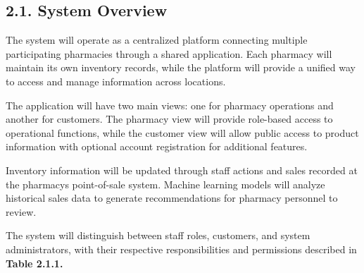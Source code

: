 \subsection{2.1. System Overview}\label{system-overview}

The system will operate as a centralized platform connecting multiple participating pharmacies through a shared application. Each pharmacy will maintain its own inventory records, while the platform will provide a unified way to access and manage information across locations.

The application will have two main views: one for pharmacy operations and another for customers. The pharmacy view will provide role-based access to operational functions, while the customer view will allow public access to product information with optional account registration for additional features.

Inventory information will be updated through staff actions and sales recorded at the pharmacy\textquotesingle s point-of-sale system. Machine learning models will analyze historical sales data to generate recommendations for pharmacy personnel to review.

The system will distinguish between staff roles, customers, and system administrators, with their respective responsibilities and permissions described in \textbf{Table 2.1.1.}

